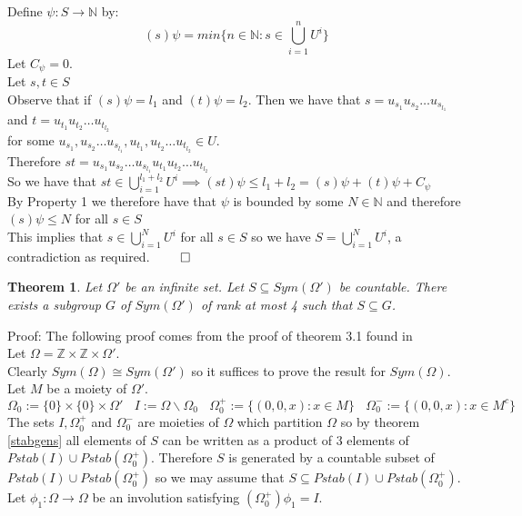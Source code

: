 \documentclass{report}
\newtheorem{theorem}{Theorem}[section]
\begin{document}
Define $\psi : S \rightarrow \mathbb{N}$ by:
$$(s)\psi = min\{n \in \mathbb{N}:s \in \bigcup_{i=1}^{n} U^i\}$$
Let $C_\psi = 0$.\\
Let $s,t \in S$\\
Observe that if $(s)\psi=l_1$ and $(t)\psi=l_2$. Then we have that $s=u_{s_1}u_{s_2} \ldots u_{s_{l_1}}$ and $t=u_{t_1}u_{t_2} \ldots u_{t_{l_2}}$\\ for some $u_{s_1},u_{s_2} \ldots u_{s_{l_1}},u_{t_1},u_{t_2}\ldots u_{t_{l_2}} \in U$.\\
Therefore $st=u_{s_1}u_{s_2} \ldots u_{s_{l_1}}u_{t_1}u_{t_2} \ldots u_{t_{l_2}}$\\
So we have that $st \in \bigcup_{i=1}^{l_1+l_2} U^i \implies (st)\psi \leq l_1 + l_2 = (s)\psi + (t)\psi + C_\psi$\\
By Property 1 we therefore have that $\psi$ is bounded by some $N \in \mathbb{N}$ and therefore $(s)\psi \leq N$ for all $s \in S$\\
This implies that $s\in \bigcup_{i=1}^{N} U^i$ for all $s \in S$ so we have $S = \bigcup_{i=1}^{N} U^i$, a contradiction as required. $\qed$
\begin{theorem} \label{finite gens} 
Let $\Omega'$ be an infinite set. Let $S\subseteq Sym(\Omega')$ be countable. There exists a subgroup $G$ of $Sym(\Omega ')$ of rank at most 4 such that $S \subseteq G$.
\end{theorem}\par
Proof: The following proof comes from the proof of theorem 3.1 found in \cite{finitegen}\\
Let $\Omega = \mathbb{Z}\times\mathbb{Z}\times\Omega'$.\\
Clearly $Sym(\Omega)\cong Sym(\Omega')$ so it suffices to prove the result for $Sym(\Omega)$.\\
Let $M$ be a moiety of $\Omega'$.
\[\Omega_0 :=\{0\}\times \{0\} \times \Omega'\ \ \ \ I := \Omega \backslash  \Omega_0\ \ \ \ \Omega_0^+  :=\{(0,0,x): x \in M\}\ \ \ \ \Omega_0^-  :=\{(0,0,x): x \in M^c\}\]
The sets $I, \Omega_0^+$ and $\Omega_0^-$ are moieties of $\Omega$ which partition $\Omega$ so by theorem \ref{stabgens} all elements of $S$ can be written as a product of 3 elements of $Pstab(I)\cup Pstab(\Omega_0^+)$. Therefore $S$ is generated by a countable subset of $Pstab(I)\cup Pstab(\Omega_0^+)$ so we may assume that $S \subseteq Pstab(I)\cup Pstab(\Omega_0^+)$.\\
Let $\phi_1:\Omega \rightarrow \Omega$ be an involution satisfying $(\Omega_0^+)\phi_1=I$.\\
\end{document}
